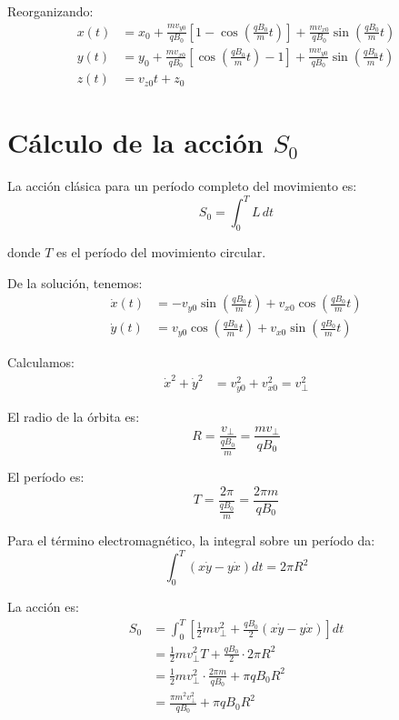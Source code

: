 \documentclass{article}
\begin{document}
Reorganizando:
\begin{align}
x(t) &= x_0 + \frac{m v_{y0}}{qB_0}\left[1 - \cos\left(\frac{qB_0}{m}t\right)\right] + \frac{m v_{x0}}{qB_0}\sin\left(\frac{qB_0}{m}t\right) \\
y(t) &= y_0 + \frac{m v_{x0}}{qB_0}\left[\cos\left(\frac{qB_0}{m}t\right) - 1\right] + \frac{m v_{y0}}{qB_0}\sin\left(\frac{qB_0}{m}t\right) \\
z(t) &= v_{z0} t + z_0
\end{align}

\section*{Cálculo de la acción  $S_0$}

La acción clásica para un período completo del movimiento es:
\begin{equation}
S_0 = \int_0^T L\, dt
\end{equation}

donde $T$ es el período del movimiento circular.

De la solución, tenemos:
\begin{align}
\dot{x}(t) &= -v_{y0}\sin\left(\frac{qB_0}{m}t\right) + v_{x0}\cos\left(\frac{qB_0}{m}t\right) \\
\dot{y}(t) &= v_{y0}\cos\left(\frac{qB_0}{m}t\right) + v_{x0}\sin\left(\frac{qB_0}{m}t\right)
\end{align}

Calculamos:
\begin{align}
\dot{x}^2 + \dot{y}^2 &= v_{y0}^2 + v_{x0}^2 = v_{\perp}^2
\end{align}

El radio de la órbita es:
\begin{equation}
R = \frac{v_{\perp}}{\frac{qB_0}{m}} = \frac{m v_{\perp}}{qB_0}
\end{equation}

El período es:
\begin{equation}
T = \frac{2\pi}{\frac{qB_0}{m}} = \frac{2\pi m}{qB_0}
\end{equation}

Para el término electromagnético, la integral sobre un período da:
\begin{equation}
\int_0^T (x\dot{y} - y\dot{x}) dt = 2\pi R^2
\end{equation}

La acción es:
\begin{align}
S_0 &= \int_0^T \left[\frac{1}{2}m v_{\perp}^2 + \frac{qB_0}{2}(x\dot{y} - y\dot{x})\right] dt \\
&= \frac{1}{2}m v_{\perp}^2 T + \frac{qB_0}{2} \cdot 2\pi R^2 \\
&= \frac{1}{2}m v_{\perp}^2 \cdot \frac{2\pi m}{qB_0} + \pi qB_0 R^2 \\
&= \frac{\pi m^2 v_{\perp}^2}{qB_0} + \pi qB_0 R^2
\end{align}
\end{document}
